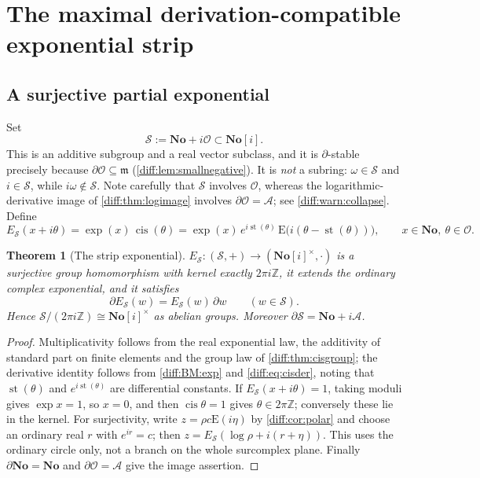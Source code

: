 \documentclass[11pt,letterpaper]{article}
\numberwithin{equation}{section}
\newtheorem{theorem}{Theorem}[section]
\theoremstyle{definition}
\theoremstyle{remark}
\newcommand{\No}{\mathbf{No}}
\newcommand{\SC}{\mathbf{No}[i]}
\newcommand{\Z}{\mathbb Z}
\newcommand{\der}{\partial}
\newcommand{\Ofin}{\mathcal O}
\newcommand{\mm}{\mathfrak m}
\newcommand{\Acl}{\mathcal A}
\newcommand{\st}{\operatorname{st}}
\newcommand{\cis}{\operatorname{cis}}
\newcommand{\Emm}{\mathrm{E}}
\newcommand{\Strip}{\mathcal S}
\newcommand{\Estrip}{E_{\Strip}}
\begin{document}
\section{The maximal derivation-compatible exponential strip}
\label{diff:sec:strip}

\subsection{A surjective partial exponential}
\label{diff:sub:stripexp}

Set
\[
 \Strip:=\No+i\Ofin\subset\SC .
\]
This is an additive subgroup and a real vector subclass, and it is
$\der$-stable precisely because $\der\Ofin\subseteq\mm$
(\cref{diff:lem:smallnegative}). It is \emph{not} a subring:
$\omega\in\Strip$ and $i\in\Strip$, while $i\omega\notin\Strip$. Note
carefully that $\Strip$ involves $\Ofin$, whereas the logarithmic-derivative
image of \cref{diff:thm:logimage} involves $\der\Ofin=\Acl$; see
\cref{diff:warn:collapse}. Define
\begin{equation}\label{diff:eq:stripexp}
 \Estrip(x+i\theta)=\exp(x)\,\cis(\theta)
 =\exp(x)\,e^{i\st(\theta)}\,\Emm\bigl(i(\theta-\st(\theta))\bigr),
 \qquad x\in\No,\ \theta\in\Ofin .
\end{equation}

\begin{theorem}[The strip exponential]
\label{diff:thm:strip}
$\Estrip:(\Strip,+)\to(\SC^{\times},\cdot)$ is a surjective group homomorphism
with kernel exactly $2\pi i\Z$, it extends the ordinary complex exponential,
and it satisfies
\begin{equation}\label{diff:eq:compat}
 \der\Estrip(w)=\Estrip(w)\,\der w\qquad(w\in\Strip).
\end{equation}
Hence $\Strip/(2\pi i\Z)\cong\SC^{\times}$ as abelian groups. Moreover
$\der\Strip=\No+i\Acl$.
\end{theorem}
\begin{proof}
Multiplicativity follows from the real exponential law, the additivity of
standard part on finite elements and the group law of
\cref{diff:thm:cisgroup}; the derivative identity follows from
\ref{diff:BM:exp} and \cref{diff:eq:cisder}, noting that
$\st(\theta)$ and $e^{i\st(\theta)}$ are differential constants. If
$\Estrip(x+i\theta)=1$, taking moduli gives $\exp x=1$, so $x=0$, and then
$\cis\theta=1$ gives $\theta\in2\pi\Z$; conversely these lie in the kernel.
For surjectivity, write $z=\rho c\Emm(i\eta)$ by \cref{diff:cor:polar} and
choose an ordinary real $r$ with $e^{ir}=c$; then
$z=\Estrip(\log\rho+i(r+\eta))$. This uses the ordinary circle only, not a
branch on the whole surcomplex plane. Finally $\der\No=\No$ and
$\der\Ofin=\Acl$ give the image assertion.
\end{proof}
\end{document}
